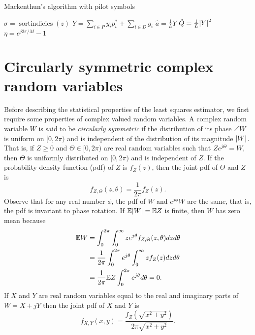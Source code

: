 \documentclass[journal]{IEEEtran}
\begin{document}
\begin{algorithm}[t] \label{alg:loglinear}
\SetAlCapFnt{\small}
\SetAlTitleFnt{}
\caption{Mackenthun's algorithm with pilot symbols}
\DontPrintSemicolon
{}
$\sigma = \operatorname{sortindicies}(z)$  \;
$Y = \sum_{i \in P} y_i p_i^* + \sum_{i \in D} g_i $ \;
$\hat{a} = \frac{1}{L} Y$ \;
$\hat{Q} = \frac{1}{L}{\left\vert Y \right\vert}^2$  \;
$\eta = e^{j2\pi/M} - 1$ \;
\end{algorithm}


\section{Circularly symmetric complex random variables}\label{sec:circ-symm-compl}

Before describing the statistical properties of the least squares estimator, we first require some properties of complex valued random variables.  A complex random variable $W$ is said to be \emph{circularly symmetric} if the distribution of its phase $\angle{W}$ is uniform on $[0,2\pi)$ and is independent of the distribution of its magnitude ${\left\vert W \right\vert}$.  That is, if $Z \geq 0$ and $\Theta \in [0,2\pi)$ are real random variables such that $Ze^{j\Theta} = W$, then $\Theta$ is uniformly distributed on $[0,2\pi)$ and is independent of $Z$.  If the probability density function (pdf) of $Z$ is $f_Z(z)$, then the joint pdf of $\Theta$ and $Z$ is 
\[
f_{Z,\Theta}(z,\theta) = \frac{1}{2\pi}f_Z(z).
\]
Observe that for any real number $\phi$, the pdf of $W$ and $e^{j\phi}W$ are the same, that is, the pdf is invariant to phase rotation.  If ${\mathbb E}{\left\vert W \right\vert} = {\mathbb E} Z$ is finite, then $W$ has zero mean because
\begin{align*}
 {\mathbb E} W &= \int_{0}^{2\pi} \int_{0}^\infty z e^{j\theta} f_{Z,\Theta}(z,\theta) dz d\theta \\
 &= \frac{1}{2\pi} \int_{0}^{2\pi} e^{j\theta} \int_{0}^\infty z f_Z(z) dz d\theta \\
 &= \frac{1}{2\pi}{\mathbb E} Z \int_{0}^{2\pi} e^{j\theta} d\theta = 0.
 \end{align*}
If $X$ and $Y$ are real random variables equal to the real and imaginary parts of $W = X + jY$ then the joint pdf of $X$ and $Y$ is
\[
f_{X,Y}(x,y) = \frac{f_Z(\sqrt{x^2 + y^2})}{2\pi \sqrt{x^2 + y^2}}.
\]
\end{document}
